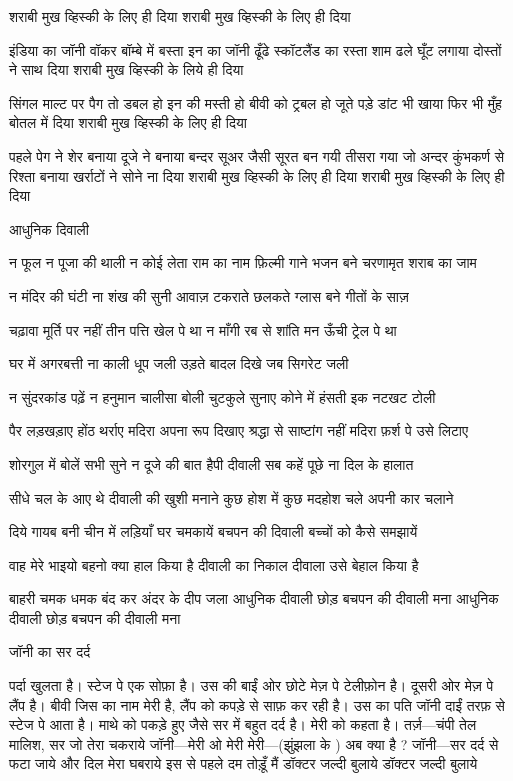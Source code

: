 शराबी मुख व्हिस्की के लिए ही दिया
शराबी मुख व्हिस्की के लिए ही दिया

इंडिया का जॉनी वॉकर बॉम्बे में बस्ता
इन का जॉनी ढूँढे स्कॉटलैंड का रस्ता
शाम ढले घूँट लगाया दोस्तों ने साथ दिया
शराबी मुख व्हिस्की के लिये ही दिया

सिंगल माल्ट पर पैग तो डबल हो
इन की मस्ती हो बीवी को ट्रबल हो
जूते पड़े डांट भी खाया
फिर भी मुँह बोतल में दिया
शराबी मुख व्हिस्की के लिए ही दिया

पहले पेग ने शेर बनाया
दूजे ने बनाया बन्दर
सूअर जैसी सूरत बन गयी
तीसरा गया जो अन्दर
कुंभकर्ण से रिश्ता बनाया
खर्राटों ने सोने ना दिया
शराबी मुख व्हिस्की के लिए ही दिया
शराबी मुख व्हिस्की के लिए ही दिया


आधुनिक दिवाली

न फूल न पूजा की थाली
न कोई लेता राम का नाम
फ़िल्मी गाने भजन बने
चरणामृत शराब का जाम

न मंदिर की घंटी ना शंख की
सुनी आवाज़
टकराते छलकते ग्लास बने
गीतों के साज़

चढ़ावा मूर्ति पर नहीं
तीन पत्ति खेल पे था
न माँगी रब से शांति
मन ऊँची ट्रेल पे था

घर में अगरबत्ती ना काली धूप जली
उड़ते बादल दिखे जब सिगरेट जली

न सुंदरकांड पढ़ें
न हनुमान चालीसा बोली
चुटकुले सुनाए कोने में
हंसती इक नटखट टोली

पैर लड़खड़ाए होंठ थर्राए
मदिरा अपना रूप दिखाए
श्रद्धा से साष्टांग नहीं
मदिरा फ़र्श पे उसे लिटाए

शोरगुल में बोलें सभी
सुने न दूजे की बात
हैपी दीवाली सब कहें
पूछे ना दिल के हालात

सीधे चल के आए थे
दीवाली की खुशी मनाने
कुछ होश में कुछ मदहोश
चले अपनी कार चलाने

दिये गायब बनी चीन में
लड़ियाँ घर चमकायें
बचपन की दिवाली
बच्चों को कैसे समझायें

वाह मेरे भाइयो बहनो
क्या हाल किया है
दीवाली का निकाल दीवाला
उसे बेहाल किया है

बाहरी चमक धमक बंद कर
अंदर के दीप जला
आधुनिक दीवाली छोड़
बचपन की दीवाली मना
आधुनिक दीवाली छोड़
बचपन की दीवाली मना



जॉनी का सर दर्द

पर्दा खुलता है। स्टेज पे एक सोफ़ा है। उस
की बाईं ओर छोटे मेज़ पे टेलीफ़ोन है। 
दूसरी ओर मेज़ पे लैंप है। बीवी जिस का 
नाम मेरी है, लैंप को कपड़े से साफ़ कर रही 
है। उस का पति जॉनी दाईं तरफ़ से स्टेज पे
आता है। माथे को पकड़े हुए जैसे सर में बहुत दर्द है।
मेरी को कहता है।
तर्ज़—चंपी तेल मालिश, सर जो तेरा चकराये
जॉनी—मेरी ओ मेरी
मेरी—(झुंझला के ) अब क्या है ?
जॉनी—सर दर्द से फटा जाये
और दिल मेरा घबराये
इस से पहले दम तोड़ूँ मैं
डॉक्टर जल्दी बुलाये
डॉक्टर जल्दी बुलाये

